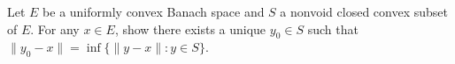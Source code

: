 Let $E$ be a uniformly convex Banach space and $S$ a nonvoid closed convex subset of $E$. For any $x \in E$, show there exists a unique $y_0 \in S$ such that $\|y_0 - x\| = \inf\{\|y - x\| : y \in S\}$.
